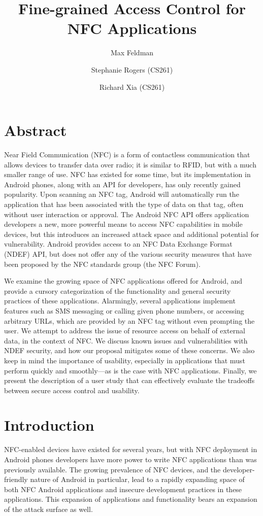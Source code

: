 \documentclass[12pt]{article}
\begin{document}
\title{Fine-grained Access Control for NFC Applications}
\author{Max Feldman \and Stephanie Rogers (CS261) \and Richard Xia (CS261)}
\maketitle

\section{Abstract}
Near Field Communication (NFC) is a form of contactless communication that allows devices to transfer data over radio; it is similar to RFID, but with a much smaller range of use.
NFC has existed for some time, but its implementation in Android phones, along with an API for developers, has only recently gained popularity.
Upon scanning an NFC tag, Android will automatically run the application that has been associated with the type of data on that tag, often without user interaction or approval.
The Android NFC API offers application developers a new, more powerful means to access NFC capabilities in mobile devices, but this introduces an increased attack space and additional potential for vulnerability.
Android provides access to an NFC Data Exchange Format (NDEF) API, but does not offer any of the various security measures that have been proposed by the NFC standards group (the NFC Forum).

We examine the growing space of NFC applications offered for Android, and provide a cursory categorization of the functionality and general security practices of these applications.
Alarmingly, several applications implement features such as SMS messaging or calling given phone numbers, or accessing arbitrary URLs, which are provided by an NFC tag without even prompting the user.
We attempt to address the issue of resource access on behalf of external data, in the context of NFC.
We discuss known issues and vulnerabilities with NDEF security, and how our proposal mitigates some of these concerns.
We also keep in mind the importance of usability, especially in applications that must perform quickly and smoothly---as is the case with NFC applications. Finally, we present the description of a user study that can effectively evaluate the tradeoffs between secure access control and usability.

\tableofcontents

\section{Introduction}
NFC-enabled devices have existed for several years, but with NFC deployment in Android phones developers have more power to write NFC applications than was previously available.
The growing prevalence of NFC devices, and the developer-friendly nature of Android in particular, lead to a rapidly expanding space of both NFC Android applications and insecure development practices in these applications.
This expansion of applications and functionality bears an expansion of the attack surface as well.
\end{document}
